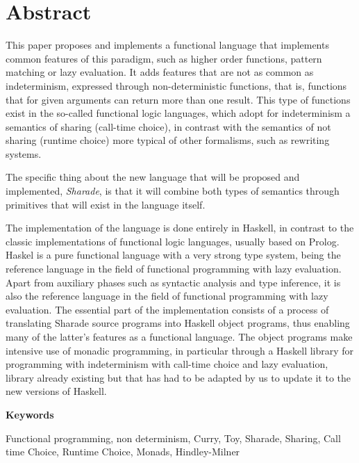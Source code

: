 \documentclass[class=article, crop=false]{standalone}
\begin{document}
\section{Abstract}

This paper proposes and implements a functional language that implements common features of
this paradigm, such as higher order functions, pattern matching or lazy evaluation. It adds
features that are not as common as indeterminism, expressed through non-deterministic
functions, that is, functions that for given arguments can return more than one result. This
type of functions exist in the so-called functional logic languages, which adopt for
indeterminism a semantics of sharing (call-time choice), in contrast with the semantics of
not sharing (runtime choice) more typical of other formalisms, such as rewriting systems.

The specific thing about the new language that will be proposed and implemented,
\textit{Sharade}, is that it will combine both types of semantics through primitives that
will exist in the language itself.

The implementation of the language is done entirely in Haskell, in contrast to the classic
implementations of functional logic languages, usually based on Prolog. Haskel is a pure
functional language with a very strong type system, being the reference language in the field
of functional programming with lazy evaluation. Apart from auxiliary phases such as syntactic
analysis and type inference, it is also the reference language in the field of functional
programming with lazy evaluation. The essential part of the implementation consists of a
process of translating Sharade source programs into Haskell object programs, thus enabling
many of the latter's features as a functional language. The object programs make intensive
use of monadic programming, in particular through a Haskell library for programming with
indeterminism with call-time choice and lazy evaluation, library already existing but that
has had to be adapted by us to update it to the new versions of Haskell.

\vspace{0.5cm}
\textbf{Keywords}

Functional programming, non determinism, Curry, Toy, Sharade, Sharing, Call time Choice,
Runtime Choice, Monads, Hindley-Milner
\end{document}

